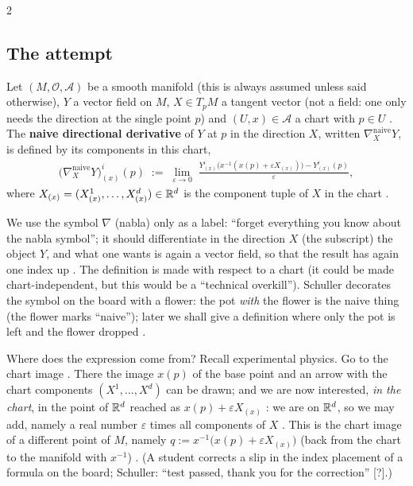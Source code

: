 \begin{paracol}{2}
\subsection{The attempt}

\begin{definition}\label{def:cf-naive}
Let $(M,\mathcal O,\mathcal A)$ be a smooth manifold (this is always assumed unless said otherwise), $Y$ a vector field on $M$,
$X\in T_pM$ a tangent vector (not a field: one only needs the direction at the single point $p$) and $(U,x)\in\mathcal A$ a chart with
$p\in U$ . The \textbf{naive directional derivative} of $Y$ at $p$ in the direction $X$, written
$\nabla^{\text{naive}}_XY$, is defined by its components in this chart,
\begin{align*}
  \bigl(\nabla^{\text{naive}}_XY\bigr)^i_{(x)}(p)\;:=\;\lim_{\varepsilon\to0}\;
  \frac{Y^i_{(x)}\bigl(x^{-1}(x(p)+\varepsilon X_{(x)})\bigr)-Y^i_{(x)}(p)}{\varepsilon},
\end{align*}
where $X_{(x)}=(X^1_{(x)},\dots,X^d_{(x)})\in\mathbb{R}^d$ is the component tuple of $X$ in the chart .
\end{definition}
We use the symbol $\nabla$ (nabla) only as a label: ``forget everything you know about the nabla symbol''; it should differentiate
in the direction $X$ (the subscript) the object $Y$, and what one wants is again a vector field, so that the result has again
one index up .
The definition is made with respect to a chart (it could be made chart-independent, but this would be a ``technical overkill'').
Schuller decorates the symbol on the board with a flower: the pot \emph{with} the flower is the naive thing
(the flower marks ``naive''); later we shall give a definition where only the pot is left and the flower dropped
.

Where does the expression come from? Recall experimental physics. Go to the chart image . There the image
$x(p)$ of the base point and an arrow with the chart components $(X^1,\dots,X^d)$ can be drawn; and we are now interested,
\emph{in the chart}, in the point of $\mathbb{R}^d$ reached as $x(p)+\varepsilon X_{(x)}$ : we are on $\mathbb{R}^d$, so we may add,
namely a real number $\varepsilon$ times all components of $X$ . This is the chart image of a different point
of $M$, namely $q:=x^{-1}\bigl(x(p)+\varepsilon X_{(x)}\bigr)$ (back from the chart to the manifold with $x^{-1}$)
.
(A student corrects a slip in the index placement of a formula on the board; Schuller: ``test passed, thank you for the
correction''  [?].)


\end{paracol}
